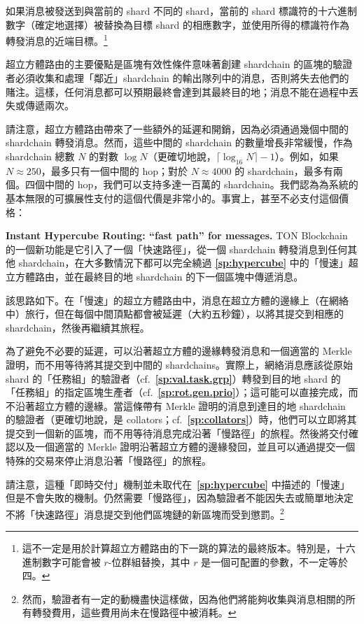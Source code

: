 \documentclass[12pt,oneside]{article}
\def\makepoint#1{\medbreak\noindent{\bf #1.\ }}
\def\nxsubpoint{\refstepcounter{subsubsection}%
  \smallbreak\makepoint{\thesubsubsection}}
\def\refpoint#1{{\rm\textbf{\ref{#1}}}}
\let\ptref=\refpoint
\def\embt(#1.){\textbf{#1.}}
\begin{document}
如果消息被發送到與當前的 shard 不同的 shard，當前的 shard 標識符的十六進制數字（確定地選擇）被替換為目標 shard 的相應數字，並使用所得的標識符作為轉發消息的近端目標。\footnote{這不一定是用於計算超立方體路由的下一跳的算法的最終版本。特別是，十六進制數字可能會被 $r$-位群組替換，其中 $r$ 是一個可配置的參數，不一定等於四。}

超立方體路由的主要優點是區塊有效性條件意味著創建 shardchain 的區塊的驗證者必須收集和處理「鄰近」shardchain 的輸出隊列中的消息，否則將失去他們的賭注。這樣，任何消息都可以預期最終會達到其最終目的地；消息不能在過程中丟失或傳遞兩次。

請注意，超立方體路由帶來了一些額外的延遲和開銷，因為必須通過幾個中間的 shardchain 轉發消息。然而，這些中間的 shardchain 的數量增長非常緩慢，作為 shardchain 總數 $N$ 的對數 $\log N$（更確切地說，$\lceil\log_{16}N\rceil-1$）。例如，如果 $N\approx250$，最多只有一個中間的 hop；對於 $N\approx4000$ 的 shardchain，最多有兩個。四個中間的 hop，我們可以支持多達一百萬的 shardchain。我們認為為系統的基本無限的可擴展性支付的這個代價是非常小的。事實上，甚至不必支付這個價格：

\nxsubpoint\label{sp:instant.hypercube} \embt(Instant Hypercube
Routing: ``fast path'' for messages.) TON Blockchain 的一個新功能是它引入了一個「快速路徑」，從一個 shardchain 轉發消息到任何其他 shardchain，在大多數情況下都可以完全繞過 \ptref{sp:hypercube} 中的「慢速」超立方體路由，並在最終目的地 shardchain 的下一個區塊中傳遞消息。

該思路如下。在「慢速」的超立方體路由中，消息在超立方體的邊緣上（在網絡中）旅行，但在每個中間頂點都會被延遲（大約五秒鐘），以將其提交到相應的 shardchain，然後再繼續其旅程。

為了避免不必要的延遲，可以沿著超立方體的邊緣轉發消息和一個適當的 Merkle 證明，而不用等待將其提交到中間的 shardchains。實際上，網絡消息應該從原始 shard 的「任務組」的驗證者（cf.~\ptref{sp:val.task.grp}）轉發到目的地 shard 的「任務組」的指定區塊生產者（cf.~\ptref{sp:rot.gen.prio}）；這可能可以直接完成，而不沿著超立方體的邊緣。當這條帶有 Merkle 證明的消息到達目的地 shardchain 的驗證者（更確切地說，是 collators；cf.~\ptref{sp:collators}）時，他們可以立即將其提交到一個新的區塊，而不用等待消息完成沿著「慢路徑」的旅程。然後將交付確認以及一個適當的 Merkle 證明沿著超立方體的邊緣發回，並且可以通過提交一個特殊的交易來停止消息沿著「慢路徑」的旅程。

請注意，這種「即時交付」機制並未取代在~\ptref{sp:hypercube} 中描述的「慢速」但是不會失敗的機制。仍然需要「慢路徑」，因為驗證者不能因失去或簡單地決定不將「快速路徑」消息提交到他們區塊鏈的新區塊而受到懲罰。\footnote{然而，驗證者有一定的動機盡快這樣做，因為他們將能夠收集與消息相關的所有轉發費用，這些費用尚未在慢路徑中被消耗。}
\end{document}
